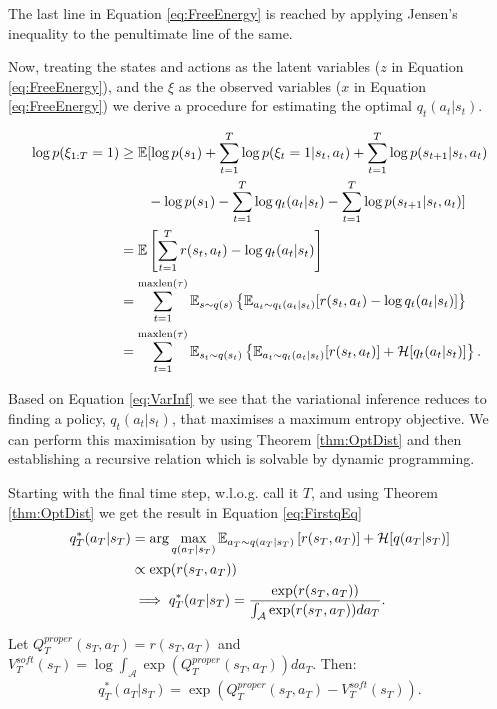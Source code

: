 \documentclass{report}
\numberwithin{equation}{section}
\numberwithin{figure}{section}
\numberwithin{table}{section}
\numberwithin{algorithm}{section}
\begin{document}
The last line in Equation \ref{eq:FreeEnergy} is reached by applying 
Jensen's inequality to the penultimate line of the same.

Now, treating the states and actions as the latent variables
($z$ in Equation \ref{eq:FreeEnergy}), 
and the $\xi$ as the observed variables ($x$ in Equation \ref{eq:FreeEnergy})
we derive a procedure for estimating the optimal $q_t(a_t|s_t)$.

\begin{align}\label{eq:VarInf}
  \log p(\xi_{1:T}=1)&\ge \mathbb{E}[
    \log p(s_1) + \sum_{t=1}^T \log p(\xi_t=1|s_t,a_t) + \sum_{t=1}^T \log p(s_{t+1}|s_t,a_t)\\
    & \qquad -\log p(s_1) - \sum_{t=1}^T \log q_t(a_t|s_t) -  \sum_{t=1}^T \log p(s_{t+1}|s_t,a_t)
  ]\notag\\
&=\mathbb{E}\left[
  \sum_{t=1}^T r(s_t,a_t) - \log q_t(a_t|s_t)
\right]\notag\\
&=\sum_{t=1}^{\text{maxlen}(\tau)} \mathbb{E}_{s\sim q(s)}\left\{
  \mathbb{E}_{a_t\sim q_t(a_t|s_t)}[r(s_t,a_t) - \log q_t(a_t|s_t)]\right\}\notag\\
&=\sum_{t=1}^{\text{maxlen}(\tau)} \mathbb{E}_{s_t\sim q(s_t)}\left\{
  \mathbb{E}_{a_t\sim q_t(a_t|s_t)}[r(s_t,a_t)] + \mathcal{H}[q_t(a_t|s_t)]\right\}.
\end{align}

Based on Equation \ref{eq:VarInf} we see that the variational inference 
reduces to finding a policy, $q_t(a_t|s_t)$, that maximises a maximum 
entropy objective. We can perform this maximisation by using 
Theorem \ref{thm:OptDist} and then establishing a recursive 
relation which is solvable by dynamic programming.

Starting with the final time step, w.l.o.g. call it $T$, and 
using Theorem \ref{thm:OptDist} we get the result in Equation 
\ref{eq:FirstqEq}
\begin{align}\label{eq:FirstqEq}
  q_T^*(a_T|s_T)&=\arg \max_{q(a_T|s_T)} \mathbb{E}_{a_T\sim q(a_T|s_T)}\left[
    r(s_T, a_T)
  \right] + \mathcal{H}[q(a_T|s_T)]\notag\\
  &\propto \exp(r(s_T,a_T))\notag\\
  &\implies q_T^*(a_T|s_T)=\frac{\exp(r(s_T,a_T))}{\int_{\mathcal{A}}\exp(r(s_T,a_T))da_T}.
\end{align}

Let $Q^{proper}_T(s_T,a_T)=r(s_T,a_T)$ and 
$V^{soft}_T(s_T)=\log\int_{\mathcal{A}}\exp(Q^{proper}_T(s_T,a_T))da_T$. 
Then: 
\begin{eqnarray*}
  q_T^*(a_T|s_T)=\exp(Q^{proper}_T(s_T,a_T)-V^{soft}_T(s_T)). 
\end{eqnarray*}
\end{document}
